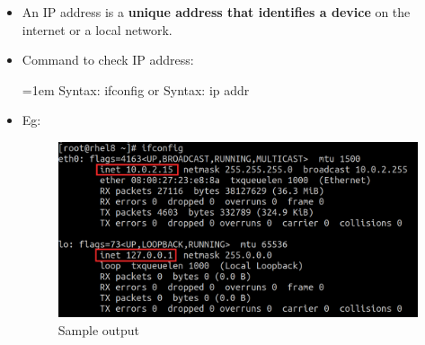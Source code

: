 \setlength{\columnsep}{3pt}
\begin{flushleft}
	
	\begin{itemize}
		\item An IP address is a \textbf{unique address that identifies a device} on the internet or a local network.
		\item Command to check IP address:
		\bigskip
		\begin{tcolorbox}[breakable,notitle,boxrule=-0pt,colback=pink,colframe=pink]
			\color{black}
			\font=1em
			Syntax: ifconfig
			\newline
			or
			\newline
			Syntax: ip addr
			\font=4pt
		\end{tcolorbox}
		\item Eg:
		\begin{figure}[h!]
			\centering
			\includegraphics[scale=.25]{content/chapter14/images/ifconfig.png}
			\caption{Sample output}
			\label{fig:ifconfig}
		\end{figure}	
		
	\end{itemize}
		
\end{flushleft}
\newpage



